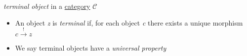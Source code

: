 \emph{terminal object} in a \hyperref[D3.6]{category} $\mathcal{C}$

\begin{itemize}
    \item  An object \emph{z} is \emph{terminal} if, for each object \emph{c} there exists a unique morphism $c \xrightarrow{!} z$
    \item We say terminal objects have a \emph{universal property}
  \end{itemize}

